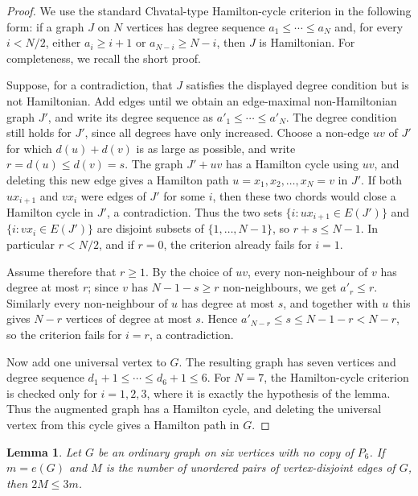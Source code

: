 \documentclass[10pt,a4paper]{article}
\theoremstyle{plain}
\newtheorem{lemma}[lemma]{Lemma}
\theoremstyle{definition}
\begin{document}
\begin{proof}
We use the standard Chvatal-type Hamilton-cycle criterion in the following form: if a graph $J$ on $N$ vertices has degree sequence $a_1\le\cdots\le a_N$ and, for every $i<N/2$, either $a_i\ge i+1$ or $a_{N-i}\ge N-i$, then $J$ is Hamiltonian.
For completeness, we recall the short proof.

Suppose, for a contradiction, that $J$ satisfies the displayed degree condition but is not Hamiltonian.
Add edges until we obtain an edge-maximal non-Hamiltonian graph $J'$, and write its degree sequence as $a'_1\le\cdots\le a'_N$.
The degree condition still holds for $J'$, since all degrees have only increased.
Choose a non-edge $uv$ of $J'$ for which $d(u)+d(v)$ is as large as possible, and write $r=d(u)\le d(v)=s$.
The graph $J'+uv$ has a Hamilton cycle using $uv$, and deleting this new edge gives a Hamilton path $u=x_1,x_2,\ldots,x_N=v$ in $J'$.
If both $ux_{i+1}$ and $vx_i$ were edges of $J'$ for some $i$, then these two chords would close a Hamilton cycle in $J'$, a contradiction.
Thus the two sets $\{i: ux_{i+1}\in E(J')\}$ and $\{i: vx_i\in E(J')\}$ are disjoint subsets of $\{1,\ldots,N-1\}$, so $r+s\le N-1$.
In particular $r<N/2$, and if $r=0$, the criterion already fails for $i=1$.

Assume therefore that $r\ge1$.
By the choice of $uv$, every non-neighbour of $v$ has degree at most $r$; since $v$ has $N-1-s\ge r$ non-neighbours, we get $a'_r\le r$.
Similarly every non-neighbour of $u$ has degree at most $s$, and together with $u$ this gives $N-r$ vertices of degree at most $s$.
Hence $a'_{N-r}\le s\le N-1-r<N-r$, so the criterion fails for $i=r$, a contradiction.

Now add one universal vertex to $G$.
The resulting graph has seven vertices and degree sequence $d_1+1\le\cdots\le d_6+1\le6$.
For $N=7$, the Hamilton-cycle criterion is checked only for $i=1,2,3$, where it is exactly the hypothesis of the lemma.
Thus the augmented graph has a Hamilton cycle, and deleting the universal vertex from this cycle gives a Hamilton path in $G$.
\end{proof}

\begin{lemma}\label{LEM:appendix-P6-disjoint-pairs}
Let $G$ be an ordinary graph on six vertices with no copy of $P_6$.
If $m=e(G)$ and $M$ is the number of unordered pairs of vertex-disjoint edges of $G$, then $2M\le3m$.
\end{lemma}
\end{document}
